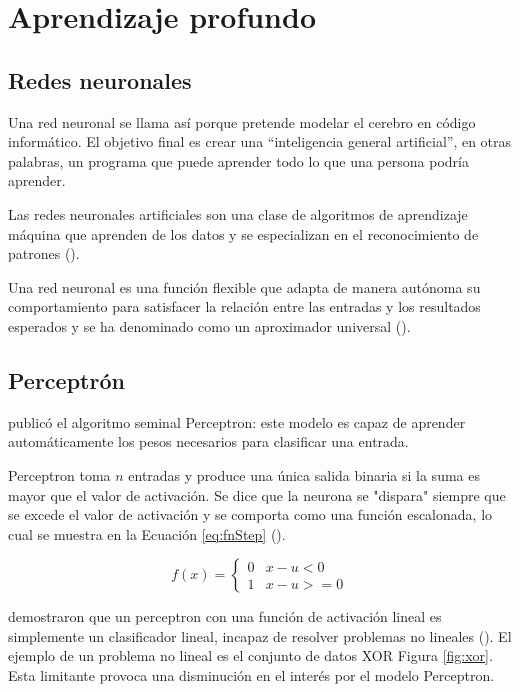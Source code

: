 \section{Aprendizaje profundo}

\subsection{Redes neuronales}

Una red neuronal se llama así porque pretende modelar el cerebro en código informático. El objetivo final es crear una “inteligencia general artificial”, en otras palabras, un programa que puede aprender todo lo que una persona podría aprender.

Las redes neuronales artificiales son una clase de algoritmos de aprendizaje máquina que aprenden de los datos y se especializan en el reconocimiento de patrones (\cite{rosebrock2017deep}).

Una red neuronal es una función flexible que adapta de manera autónoma su comportamiento para satisfacer la relación entre las entradas y los resultados esperados y se ha denominado como un aproximador universal (\cite{goyal2018Deep}).

\subsection{Perceptrón}

\citeauthor{rosenblatt1958Perceptron} publicó el algoritmo seminal Perceptron: este modelo es capaz de aprender automáticamente los pesos necesarios para clasificar una entrada.

Perceptron toma $n$ entradas y produce una única salida binaria si la suma es mayor que el valor de activación. Se dice que la neurona se "dispara" siempre que se excede el valor de activación y se comporta como una función escalonada, lo cual se muestra en la Ecuación \ref{eq:fnStep} (\cite{goyal2018Deep}).

\begin{equation}
\label{eq:fnStep}
    f\left(x\right)=\begin{cases}0 & x -u < 0\\1 & x -u >= 0\end{cases}
\end{equation}



\citeauthor{minsky1969Perceptrons} demostraron que un perceptron con una función de activación lineal es simplemente un clasificador lineal, incapaz de resolver problemas no lineales (\cite{rosebrock2017deep}). El ejemplo de un problema no lineal es el conjunto de datos XOR Figura \ref{fig:xor}. Esta limitante provoca una disminución en el interés por el modelo Perceptron.


